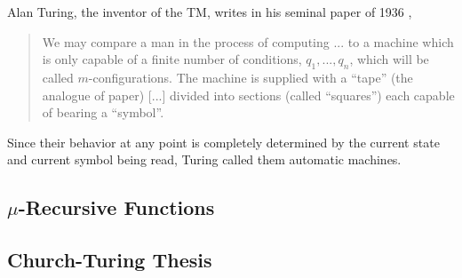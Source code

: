 \documentclass[english, 12pt]{article}
\begin{document}
 Alan Turing, the inventor of the TM, writes in his seminal paper of 1936 , 
 \begin{quote}We may compare a man in the process of computing \!...\!\! to a
                        machine which is only capable of a finite number of conditions,
                        $q_1, ..., q_n$, which will be called $m$-configurations.
                         The machine is supplied with a
                       ``tape'' (the analogue of paper) [...] divided into sections 
                       (called ``squares'') each capable of bearing a ``symbol''.
\end{quote}
Since their behavior at any point is completely determined  by the
current state and current symbol being read, Turing called them 
automatic machines. 


  \subsection{$\mu$-Recursive Functions}
  \subsection{Church-Turing Thesis}
  
\end{document}
